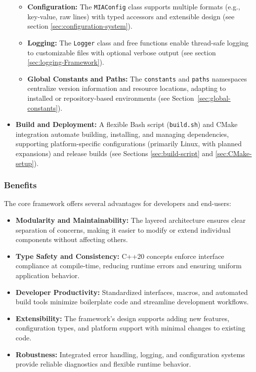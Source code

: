\begin{itemize}
\begin{itemize}
		\item \textbf{Configuration:} The \texttt{MIAConfig} class supports multiple formats (e.g., key-value, raw lines) with typed accessors and extensible design (see section \ref{sec:configuration-system}).
		\item \textbf{Logging:} The \texttt{Logger} class and free functions enable thread-safe logging to customizable files with optional verbose output (see section \ref{sec:logging-Framework}).
		\item \textbf{Global Constants and Paths:} The \texttt{constants} and \texttt{paths} namespaces centralize version information and resource locations, adapting to installed or repository-based environments (see Section~\ref{sec:global-constants}).
	\end{itemize}
	\item \textbf{Build and Deployment:} A flexible Bash script (\texttt{build.sh}) and CMake integration automate building, installing, and managing dependencies, supporting platform-specific configurations (primarily Linux, with planned expansions) and release builds (see Sections \ref{sec:build-script} and \ref{sec:CMake-setup}).
\end{itemize}

\subsubsection{Benefits}
The core framework offers several advantages for developers and end-users:
\begin{itemize}
	\item \textbf{Modularity and Maintainability:} The layered architecture ensures clear separation of concerns, making it easier to modify or extend individual components without affecting others.
	\item \textbf{Type Safety and Consistency:} C++20 concepts enforce interface compliance at compile-time, reducing runtime errors and ensuring uniform application behavior.
	\item \textbf{Developer Productivity:} Standardized interfaces, macros, and automated build tools minimize boilerplate code and streamline development workflows.
	\item \textbf{Extensibility:} The framework's design supports adding new features, configuration types, and platform support with minimal changes to existing code.
	\item \textbf{Robustness:} Integrated error handling, logging, and configuration systems provide reliable diagnostics and flexible runtime behavior.
\end{itemize}


